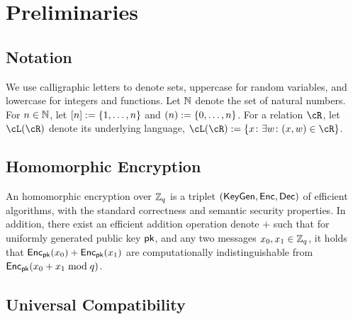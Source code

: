 \section{Preliminaries}\label{sec:Preliminaries}

\subsection{Notation} 
We use calligraphic letters to denote sets, uppercase for random variables, and lowercase for integers and functions. %
Let ${\mathbb{N}}$ denote the set of natural numbers.  For $n\in {\mathbb{N}}$, let $[n] \eqdef \set{1,\ldots,n}$ and $(n) \eqdef \set{0,\ldots,n}$.  For a relation $\cR$, let $\cL(\cR)$ denote its underlying language, \ie  $\cL(\cR) \eqdef \set{x\colon \exists w \colon (x,w) \in \cR}$.    


\subsection{Homomorphic Encryption}

An homomorphic encryption over ${\mathbb Z}_q$ is a triplet $(\mathsf{KeyGen},\mathsf{Enc},\mathsf{Dec})$ of efficient algorithms, with the standard correctness and semantic security properties.  In addition, there exist an efficient  addition operation denote $+$  such that for uniformly  generated public key  ${\mathsf{pk}}$, and any two  messages $x_0,x_1\in {\mathbb Z}_q$,  it holds that  $\mathsf{Enc}_{\mathsf{pk}}(x_0) + \mathsf{Enc}_{\mathsf{pk}}(x_1) $ are computationally indistinguishable from $\mathsf{Enc}_{\mathsf{pk}}(x_0+ x_1 \bmod q)$.


\subsection{Universal Compatibility}

